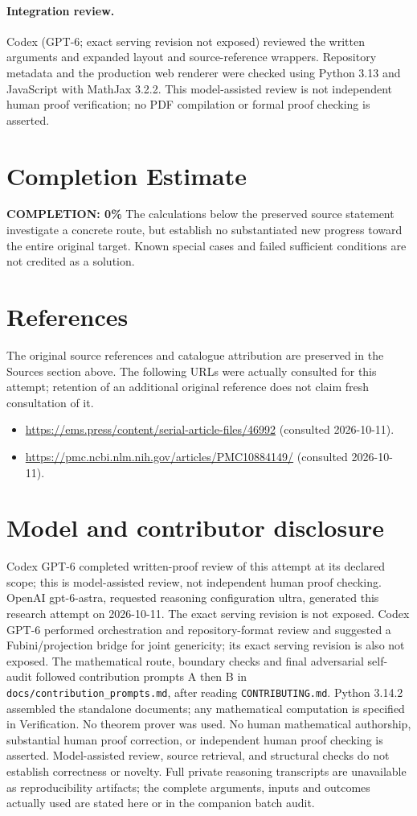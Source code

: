 \documentclass[11pt]{article}
\begin{document}
\paragraph{Integration review.} Codex (GPT-6; exact serving revision not exposed) reviewed the written arguments and expanded layout and source-reference wrappers. Repository metadata and the production web renderer were checked using Python 3.13 and JavaScript with MathJax 3.2.2. This model-assisted review is not independent human proof verification; no PDF compilation or formal proof checking is asserted.

\section{Completion Estimate}
\noindent\textbf{COMPLETION: 0\%}
The calculations below the preserved source statement investigate a concrete route,
but establish no substantiated new progress toward the entire original target.
Known special cases and failed sufficient conditions are not credited as a solution.
\section{References}
The original source references and catalogue attribution are preserved in the
Sources section above. The following URLs were actually consulted for this attempt;
retention of an additional original reference does not claim fresh consultation of it.
\begin{itemize}
\item \url{https://ems.press/content/serial-article-files/46992} (consulted 2026-10-11). 
\item \url{https://pmc.ncbi.nlm.nih.gov/articles/PMC10884149/} (consulted 2026-10-11). 
\end{itemize}
\section{Model and contributor disclosure}
Codex GPT-6 completed written-proof review of this attempt at its declared scope; this is model-assisted review, not independent human proof checking.
OpenAI gpt-6-astra, requested reasoning configuration ultra, generated this research
attempt on 2026-10-11. The exact serving revision is not exposed. Codex GPT-6
performed orchestration and repository-format review and suggested a Fubini/projection bridge for joint genericity; its exact serving revision
is also not exposed. The mathematical route, boundary checks and final adversarial
self-audit followed contribution prompts A then B in
\texttt{docs/contribution\_prompts.md}, after reading \texttt{CONTRIBUTING.md}.
Python 3.14.2 assembled the standalone documents; any mathematical computation is
specified in Verification. No theorem prover was used. No human mathematical
authorship, substantial human proof correction, or independent human proof checking
is asserted. Model-assisted review, source retrieval, and structural checks do not
establish correctness or novelty. Full private reasoning transcripts are unavailable
as reproducibility artifacts; the complete arguments, inputs and outcomes actually
used are stated here or in the companion batch audit.
\end{document}
